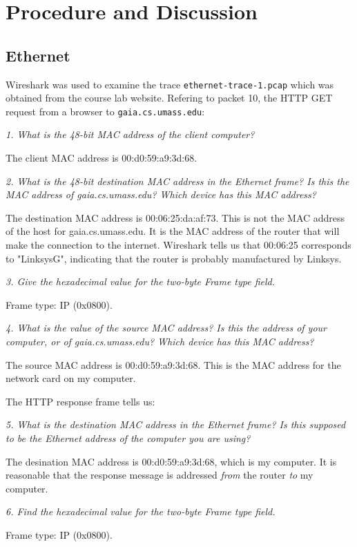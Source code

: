 \section{Procedure and Discussion}\label{sec:p-and-d}
\subsection{Ethernet}\label{sec:ethernet}
Wireshark was used to examine the trace \texttt{ethernet-trace-1.pcap} which was obtained from the course lab website. Refering to packet 10, the HTTP GET request from a browser to \texttt{gaia.cs.umass.edu}:

\textit{1. What is the 48-bit MAC address of the client computer?}

The client MAC address is 00:d0:59:a9:3d:68.
	
\textit{2. What is the 48-bit destination MAC address in the Ethernet frame? Is this the MAC address of gaia.cs.umass.edu? Which device has this MAC address?}

The destination MAC address is 00:06:25:da:af:73. This is not the MAC address of the host for gaia.cs.umass.edu. It is the MAC address of the router that will make the connection to the internet. Wireshark tells us that 00:06:25 corresponds to "LinksysG", indicating that the router is probably manufactured by Linksys.
	
\textit{3. Give the hexadecimal value for the two-byte Frame type field.}

Frame type: IP (0x0800).
	
\textit{4. What is the value of the source MAC address? Is this the address of your computer, or of gaia.cs.umass.edu? Which device has this MAC address?}

The source MAC address is 00:d0:59:a9:3d:68. This is the MAC address for the network card on my computer.

\newpage
The HTTP response frame tells us:

\textit{5. What is the destination MAC address in the Ethernet frame? Is this supposed to be the Ethernet address of the computer you are using?}

The desination MAC address is 00:d0:59:a9:3d:68, which is my computer. It is reasonable that the response message is addressed \textit{from} the router \textit{to} my computer.
	
\textit{6. Find the hexadecimal value for the two-byte Frame type field.}

Frame type: IP (0x0800).

